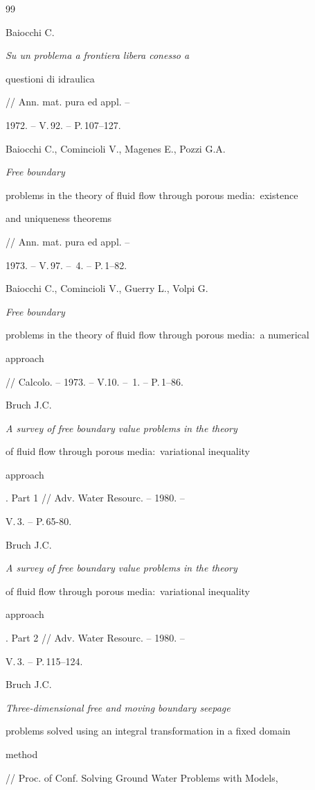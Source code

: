 \begin{thebibliography}{99}







Baiocchi C. {\em Su un problema a frontiera libera conesso a


questioni di idraulica} // Ann. mat. pura ed appl. --


1972. -- V.\,92. -- P.\,107--127.




Baiocchi C., Comincioli V., Magenes E., Pozzi G.A. {\em Free boundary


problems in the theory of fluid flow through porous media$:$ existence


and uniqueness theorems} // Ann. mat. pura ed appl. --


1973. -- V.\,97. -- \No\,4. -- P.\,1--82.




Baiocchi C., Comincioli V., Guerry L., Volpi G. {\em Free boundary


problems in the theory of fluid flow through porous media$:$ a numerical


approach} // Calcolo. -- 1973. -- V.10. -- \No\,1. -- P.\,1--86.




Bruch J.C. {\em A survey of free boundary value problems in the theory


of fluid flow through porous media$:$ variational inequality


approach}. Part 1 // Adv. Water Resourc. -- 1980. --


V.\,3. -- P.\,65-80.




Bruch J.C. {\em A survey of free boundary value problems in the theory


of fluid flow through porous media$:$ variational inequality


approach}. Part 2 // Adv. Water Resourc. -- 1980. --


V.\,3. -- P.\,115--124.




Bruch J.C. {\em Three-dimensional free and moving boundary seepage


problems solved using an integral transformation in a fixed domain


method} // Proc. of Conf. Solving Ground Water Problems with Models,



\end{thebibliography}

